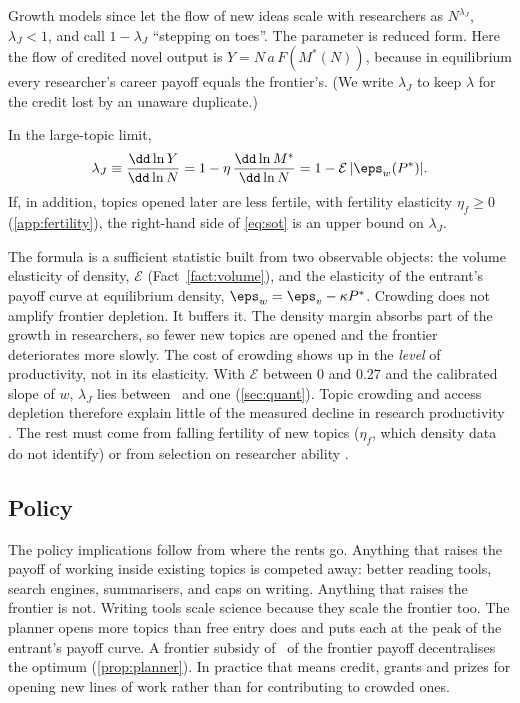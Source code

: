 Growth models since \citet{jones1995} let the flow of new ideas scale with
researchers as $N^{\lambda_J}$, $\lambda_J<1$, and call $1-\lambda_J$ ``stepping on
toes''. The parameter is reduced form. Here the flow of credited novel output
is $Y=N\,a\,F(M^*(N))$, because in equilibrium every researcher's career payoff
equals the frontier's. (We write $\lambda_J$ to keep $\lambda$ for the credit lost
by an unaware duplicate.)

\begin{proposition}\label{prop:sot}
In the large-topic limit,
\begin{equation}\label{eq:sot}
\lambda_J\equiv\frac{\dd\ln Y}{\dd\ln N}=1-\eta\,\frac{\dd\ln M^*}{\dd\ln N}=1-\mathcal E\,|\eps_w(P^*)|.
\end{equation}
If, in addition, topics opened later are less fertile, with fertility elasticity $\eta_f\ge0$ (\cref{app:fertility}), the right-hand side of \eqref{eq:sot} is an upper bound on $\lambda_J$.
\end{proposition}

The formula is a sufficient statistic built from two observable objects: the
volume elasticity of density, $\mathcal E$ (Fact~\ref{fact:volume}), and the
elasticity of the entrant's payoff curve at equilibrium density,
$\eps_w=\eps_v-\kappa P^*$. Crowding does not amplify frontier depletion. It
buffers it. The density margin absorbs part of the growth in researchers, so
fewer new topics are opened and the frontier deteriorates more slowly. The cost
of crowding shows up in the \emph{level} of productivity, not in its elasticity.
With $\mathcal E$ between 0 and 0.27 and the calibrated slope of $w$,
$\lambda_J$ lies between \calLambdaLo\ and one (\cref{sec:quant}). Topic
crowding and access depletion therefore explain little of the measured decline in
research productivity \citep{bloometal2020}. The rest must come from falling
fertility of new topics ($\eta_f$, which density data do not identify) or from
selection on researcher ability \citep{ekerdtwu2024}.

\subsection{Policy}

The policy implications follow from where the rents go. Anything that raises the
payoff of working inside existing topics is competed away: better reading
tools, search engines, summarisers, and caps on writing. Anything that raises the
frontier is not. Writing tools scale science because they scale the frontier
too. The planner opens more topics than free entry does and puts each at the
peak of the entrant's payoff curve. A frontier subsidy of \calSubsidy\ of the
frontier payoff decentralises the optimum (\cref{prop:planner}). In practice that
means credit, grants and prizes for opening new lines of work rather than for
contributing to crowded ones.
